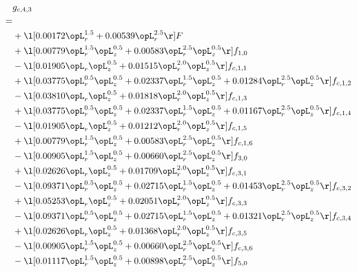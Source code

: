 \begin{alignat}{2} 
\label{eq:g_43_0} 
& g_{c,4,3} \nonumber \\ 
 = \\ 
& + \l[  0.00172 \opL_r^{1.5} +  0.00539 \opL_r^{2.5}  \r] F \nonumber \\ 
& + \l[  0.00779 \opL_r^{1.5} \opL_z^{0.5} +  0.00583 \opL_r^{2.5} \opL_z^{0.5}  \r] f_{1,0} \nonumber \\ 
& - \l[  0.01905 \opL_r \opL_z^{0.5} +  0.01515 \opL_r^{2.0} \opL_z^{0.5}  \r] f_{c,1,1} \nonumber \\ 
& + \l[  0.03775 \opL_r^{0.5} \opL_z^{0.5} +  0.02337 \opL_r^{1.5} \opL_z^{0.5} +  0.01284 \opL_r^{2.5} \opL_z^{0.5}  \r] f_{c,1,2} \nonumber \\ 
& - \l[  0.03810 \opL_r \opL_z^{0.5} +  0.01818 \opL_r^{2.0} \opL_z^{0.5}  \r] f_{c,1,3} \nonumber \\ 
& + \l[  0.03775 \opL_r^{0.5} \opL_z^{0.5} +  0.02337 \opL_r^{1.5} \opL_z^{0.5} +  0.01167 \opL_r^{2.5} \opL_z^{0.5}  \r] f_{c,1,4} \nonumber \\ 
& - \l[  0.01905 \opL_r \opL_z^{0.5} +  0.01212 \opL_r^{2.0} \opL_z^{0.5}  \r] f_{c,1,5} \nonumber \\ 
& + \l[  0.00779 \opL_r^{1.5} \opL_z^{0.5} +  0.00583 \opL_r^{2.5} \opL_z^{0.5}  \r] f_{c,1,6} \nonumber \\ 
& - \l[  0.00905 \opL_r^{1.5} \opL_z^{0.5} +  0.00660 \opL_r^{2.5} \opL_z^{0.5}  \r] f_{3,0} \nonumber \\ 
& + \l[  0.02626 \opL_r \opL_z^{0.5} +  0.01709 \opL_r^{2.0} \opL_z^{0.5}  \r] f_{c,3,1} \nonumber \\ 
& - \l[  0.09371 \opL_r^{0.5} \opL_z^{0.5} +  0.02715 \opL_r^{1.5} \opL_z^{0.5} +  0.01453 \opL_r^{2.5} \opL_z^{0.5}  \r] f_{c,3,2} \nonumber \\ 
& + \l[  0.05253 \opL_r \opL_z^{0.5} +  0.02051 \opL_r^{2.0} \opL_z^{0.5}  \r] f_{c,3,3} \nonumber \\ 
& - \l[  0.09371 \opL_r^{0.5} \opL_z^{0.5} +  0.02715 \opL_r^{1.5} \opL_z^{0.5} +  0.01321 \opL_r^{2.5} \opL_z^{0.5}  \r] f_{c,3,4} \nonumber \\ 
& + \l[  0.02626 \opL_r \opL_z^{0.5} +  0.01368 \opL_r^{2.0} \opL_z^{0.5}  \r] f_{c,3,5} \nonumber \\ 
& - \l[  0.00905 \opL_r^{1.5} \opL_z^{0.5} +  0.00660 \opL_r^{2.5} \opL_z^{0.5}  \r] f_{c,3,6} \nonumber \\ 
& - \l[  0.01117 \opL_r^{1.5} \opL_z^{0.5} +  0.00898 \opL_r^{2.5} \opL_z^{0.5}  \r] f_{5,0} \nonumber \\ 

\end{alignat}
